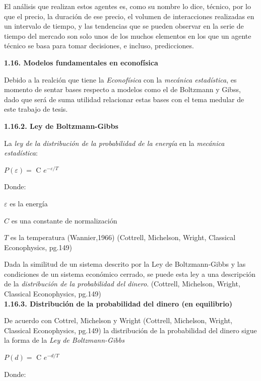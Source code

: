 El análisis que realizan estos agentes es, como su nombre lo dice, técnico, por lo que el precio, la duración de ese precio, el volumen de interacciones realizadas en un intervalo de tiempo, y las tendencias que se pueden observar en la serie de tiempo del mercado son solo unos de los muchos elementos en los que un agente técnico se basa para tomar decisiones, e incluso, predicciones.
\newline

{
\noindent
\Large  \textbf{1.16. Modelos fundamentales en econofísica} 
}

Debido a la realción que tiene la \textit{Econofísica} con la \textit{mecánica estadística}, es momento de sentar bases respecto a modelos como el de Boltzmann y Gibss, dado que será de suma utilidad relacionar estas bases con el tema medular de este trabajo de tesis.
\newline
\vspace{0.5cm}


{
\noindent
\Large  \textbf{1.16.2. Ley de Boltzmann-Gibbs} 
}

La \textit{ley de la distribución de la probabilidad de la energía} en la \textit{mecánica estadística}:

\begin{center}
$\mathit{P(\varepsilon)} = $ C $e^{-\varepsilon/\mathit{T}}$ 
\end{center}
Donde:

$\varepsilon$ es la energía

$C$ es una constante de normalización

$\mathit{T}$ es la temperatura (Wannier,1966) (Cottrell, Michelson, Wright, Classical Econophysics, pg.149)

Dada la similitud de un sistema descrito por la Ley de Boltzmann-Gibbs y las condiciones de un sistema económico cerrado, se puede esta ley a una descripción de la \textit{distribución de la probabilidad del dinero}.
(Cottrell, Michelson, Wright, Classical Econophysics, pg.149)
\\

{
\noindent
\Large  \textbf{1.16.3. Distribución de la probabilidad del dinero (en equilibrio)} 
}


De acuerdo con Cottrel, Michelson y Wright (Cottrell, Michelson, Wright, Classical Econophysics, pg.149) la distribución de la probabilidad del dinero sigue la forma de la \textit{Ley de Boltzmann-Gibbs}


\begin{center}
$\mathit{P(d)} = $ C $e^{-d/\mathit{T}}$ 
\end{center}
Donde:

